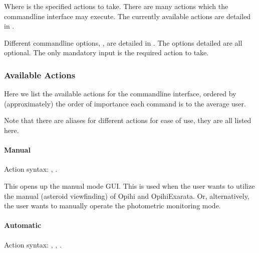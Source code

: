 \documentclass[letterpaper,11pt,english]{sphinxmanual}
\begin{document}
\sphinxAtStartPar
Where \sphinxcode{\sphinxupquote{{[}action{]}}} is the specified actions to take. There are many actions
which the command\sphinxhyphen{}line interface may execute. The currently available actions
are detailed in {\hyperref[\detokenize{user/command_line:user-command-line-available-actions}]{}}.

\sphinxAtStartPar
Different command\sphinxhyphen{}line options, \sphinxcode{\sphinxupquote{{[}options{]}}}, are detailed in {\hyperref[\detokenize{user/command_line:user-command-line-available-options}]{}}. The options detailed are all
optional. The only mandatory input is the required action to take.


\subsubsection{Available Actions}
\label{\detokenize{user/command_line:available-actions}}\label{\detokenize{user/command_line:user-command-line-available-actions}}
\sphinxAtStartPar
Here we list the available actions for the command\sphinxhyphen{}line interface, ordered by
(approximately) the order of importance each command is to the average user.

\sphinxAtStartPar
Note that there are aliases for different actions for ease of use, they
are all listed here.


\paragraph{Manual}
\label{\detokenize{user/command_line:manual}}\label{\detokenize{user/command_line:user-command-line-available-actions-manual}}
\sphinxAtStartPar
Action syntax: , .

\sphinxAtStartPar
This opens up the manual mode GUI. This is used when the user wants to
utilize the manual (asteroid view\sphinxhyphen{}finding) of Opihi and OpihiExarata. Or,
alternatively, the user wants to manually operate the photometric monitoring
mode.


\paragraph{Automatic}
\label{\detokenize{user/command_line:automatic}}\label{\detokenize{user/command_line:user-command-line-available-actions-automatic}}
\sphinxAtStartPar
Action syntax: , , .
\end{document}
